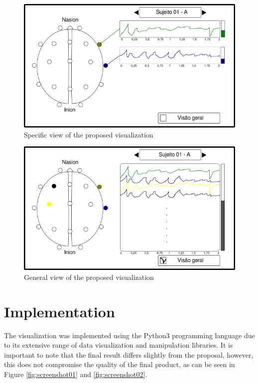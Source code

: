 \documentclass[format=sigconf]{acmart}
\begin{document}
		\begin{figure}[h]
			\centering
			\includegraphics[width=\linewidth]{../presentation/images/g3714}
			\caption{Specific view of the proposed visualization}
			\label{fig:g3714}
		\end{figure}
		
		\begin{figure}[h]
			\centering
			\includegraphics[width=\linewidth]{../presentation/images/g3762}
			\caption{General view of the proposed visualization}
			\label{fig:g3762}
		\end{figure}
	
	\section{Implementation}
		\par The visualization was implemented using the Python3 \cite{Python3} programming language due to its extensive range of data visualization and manipulation libraries. It is important to note that the final result differs slightly from the proposal, however, this does not compromise the quality of the final product, as can be seen in Figure \ref{fig:screenshot01} and \ref{fig:screenshot02}.
		
\end{document}
